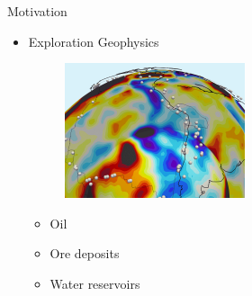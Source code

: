 \documentclass[12pt]{beamer}
\begin{document}
\begin{frame}{Motivation}
    \begin{itemize}
    \pause
        \item Exploration Geophysics
        \begin{figure}
            \centering
            \includegraphics[width=0.5\textwidth]{geophysics_image_11-19-2023.png}
            \label{fig:motivation}
        \end{figure}
        \pause 
        \begin{itemize}
            \item Oil
            \item Ore deposits
            \item Water reservoirs
        \end{itemize}
    \end{itemize}
\end{frame}
\end{document}
